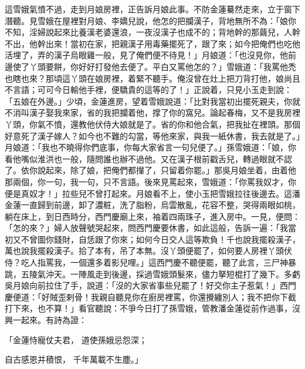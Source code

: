 \begin{showcontents}{}
這雪娥氣憤不過，走到月娘房裡，正告訴月娘此事。不防金蓮驀然走來，立于窗下潛聽。見雪娥在屋裡對月娘、李嬌兒說，他怎的把攔漢子，背地無所不為：「娘你不知，淫婦說起來比養漢老婆還浪，一夜沒漢子也成不的；背地幹的那繭兒，人幹不出，他幹出來！當初在家，把親漢子用毒藥擺死了，跟了來；如今把俺們也吃他活埋了，弄的漢子烏眼雞一般，見了俺們便不待見！」月娘道：「也沒見你，他前邊使了丫頭要餅，你好好打發他去便了。平白又罵他怎的？」雪娥道：「我罵他禿也瞎也來？那頃這丫頭在娘房裡，着緊不聽手。俺沒曾在灶上把刀背打他，娘尚且不言語；可可今日輸他手裡，便驕貴的這等的了！」正說着，只見小玉走到說：「五娘在外邊。」少頃，金蓮進房，望着雪娥說道：「比對我當初出擺死親夫，你就不消叫漢子娶我來家，省的我把攔着他，撑了你的窩兒。論起春梅，又不是我房裡丫頭，你氣不憤，還教他伏侍大娘就是了。省的你和他合氣，把我扯在裡頭。那個好意死了漢子嫁人？如今也不難的勾當，等他來家，與我一紙休書，我去就是了。」月娘道：「我也不曉得你們底事，你每大家省言一句兒便了。」孫雪娥道：「娘，你看他嘴似淮洪也一般，隨問誰也辦不過他。又在漢子根前戳舌兒，轉過眼就不認了。依你說起來，除了娘，把俺們都攆了，只留着你罷。」那吳月娘坐着，由着他那兩個，你一句，我一句，只不言語。後來見罵起來，雪娥道：「你罵我奴才，你便是真奴才！」拉些兒不曾打起來。月娘看不上，使小玉把雪娥拉往後邊去。這潘金蓮一直歸到前邊，卸了濃粧，洗了脂粉，烏雲散亂，花容不整，哭得兩眼如桃，躺在床上，到日西時分，西門慶廟上來，袖着四兩珠子，進入房中。一見，便問：「怎的來？」婦人放聲號哭起來，問西門慶要休書，如此這般，告訴一遍：「我當初又不曾圖你錢財，自恁跟了你來；如何今日交人這等欺負！千也說我擺殺漢子，萬也說我擺殺漢子。拾了本有，吊了本無。沒丫頭便罷了，如何要人房裡丫頭伏侍？吃人指罵我，一個還多着影兒哩。」這西門慶不聽便罷，聽了此言，三尸神暴跳，五陵氣沖天。一陣風走到後邊，採過雪娥頭髮來，儘力拏短棍打了幾下。多虧吳月娘向前拉住了手，說道：「沒的大家省事些兒罷了！好交你主子惹氣！」西門慶便道：「好賊歪剌骨！我親自聽見你在廚房裡罵，你還攪纏別人；我不把你下截打下來，也不算！」看官聽說：不爭今日打了孫雪娥，管教潘金蓮從前作過事，沒興一起來。有詩為證：

「金蓮恃寵仗夫君，  道使孫娥忌怨深；

自古感恩并積恨，  千年萬載不生塵。」


\end{showcontents}
